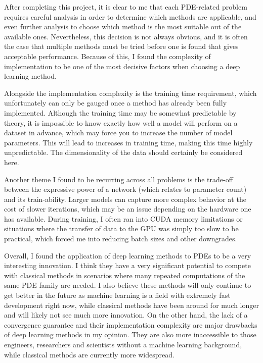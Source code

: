After completing this project, it is clear to me that each PDE-related problem requires careful analysis in order to determine which methods are applicable, and even further analysis to choose which method is the most suitable out of the available ones. Nevertheless, this decision is not always obvious, and it is often the case that multiple methods must be tried before one is found that gives acceptable performance. Because of this, I found the complexity of implementation to be one of the most decisive factors when choosing a deep learning method.

Alongside the implementation complexity is the training time requirement, which unfortunately can only be gauged once a method has already been fully implemented. Although the training time may be somewhat predictable by theory, it is impossible to know exactly how well a model will perform on a dataset in advance, which may force you to increase the number of model parameters. This will lead to increases in training time, making this time highly unpredictable. The dimensionality of the data should certainly be considered here.

Another theme I found to be recurring across all problems is the trade-off between the expressive power of a network (which relates to parameter count) and its train-ability. Larger models can capture more complex behavior at the cost of slower iterations, which may be an issue depending on the hardware one has available. During training, I often ran into CUDA memory limitations or situations where the transfer of data to the GPU was simply too slow to be practical, which forced me into reducing batch sizes and other downgrades.

Overall, I found the application of deep learning methods to PDEs to be a very interesting innovation. I think they have a very significant potential to compete with classical methods in scenarios where many repeated computations of the same PDE family are needed. I also believe these methods will only continue to get better in the future as machine learning is a field with extremely fast development right now, while classical methods have been around for much longer and will likely not see much more innovation. On the other hand, the lack of a convergence guarantee and their implementation complexity are major drawbacks of deep learning methods in my opinion. They are also more inaccessible to those engineers, researchers and scientists without a machine learning background, while classical methods are currently more widespread.

